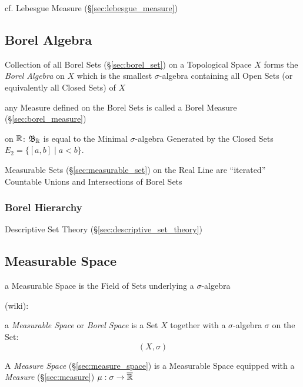 cf. Lebesgue Measure (\S\ref{sec:lebesgue_measure})



\subsection{Borel Algebra}\label{sec:borel_algebra}

Collection of all Borel Sets (\S\ref{sec:borel_set}) on a Topological Space $X$
forms the \emph{Borel Algebra} on $X$ which is the smallest $\sigma$-algebra
containing all Open Sets (or equivalently all Closed Sets) of $X$

any Measure defined on the Borel Sets is called a Borel Measure
(\S\ref{sec:borel_measure})

on $\mathbb{R}$: $\mathfrak{B}_{\mathbb{R}}$ is equal to the Minimal $\sigma$-algebra
Generated by the Closed Sets $E_2 = \{ [a,b] \;|\; a < b \}$.

Measurable Sets (\S\ref{sec:measurable_set}) on the Real Line are ``iterated''
Countable Unions and Intersections of Borel Sets



\subsubsection{Borel Hierarchy}\label{sec:borel_hierarchy}\hfill

\fist Descriptive Set Theory (\S\ref{sec:descriptive_set_theory})



\subsection{Measurable Space}\label{sec:measurable_space}

a Measurable Space is the Field of Sets underlying a $\sigma$-algebra

(wiki):

a \emph{Measurable Space} or \emph{Borel Space} is a Set $X$ together with a
$\sigma$-algebra $\sigma$ on the Set:
\[
  (X,\sigma)
\]

\fist A \emph{Measure Space} (\S\ref{sec:measure_space}) is a Measurable Space
equipped with a \emph{Measure} (\S\ref{sec:measure})
$\mu : \sigma \rightarrow \overline{\mathbb{R}}$

